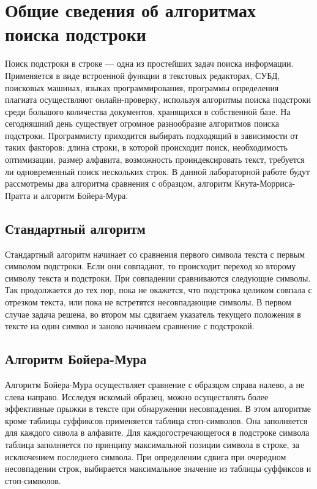 \documentclass[12pt]{report}
\begin{document}
\section{Общие сведения об алгоритмах поиска подстроки}
\par
Поиск подстроки в строке — одна из простейших задач поиска информации. Применяется в виде встроенной функции в текстовых редакторах, СУБД, поисковых машинах, языках программирования, программы определения плагиата осуществляют онлайн-проверку, используя алгоритмы поиска подстроки среди большого количества документов, хранящихся в собственной базе\cite{1}.
На сегодняшний день существует огромное разнообразие алгоритмов поиска подстроки. Программисту приходится выбирать подходящий в зависимости от таких факторов: длина строки, в которой происходит поиск, необходимость оптимизации, размер алфавита, возможность проиндексировать текст, требуется ли одновременный поиск нескольких строк.  В данной лабораторной работе будут рассмотремы два алгоритма сравнения с образцом, алгоритм Кнута-Морриса-Пратта и алгоритм Бойера-Мура.

\subsection{Стандартный алгоритм}
Стандартный алгоритм начинает со сравнения первого символа текста с первым символом подстроки. Если они совпадают, то происходит переход ко второму символу текста и подстроки. При совпадении сравниваются следующие символы. Так продолжается до тех пор, пока не окажется, что подстрока целиком совпала с отрезком текста, или пока не встретятся несовпадающие символы. В первом случае задача решена, во втором мы сдвигаем указатель текущего положения в тексте на один символ и заново начинаем сравнение с подстрокой\cite{2}.

\subsection{Алгоритм Бойера-Мура}
Алгоритм Бойера-Мура осуществляет сравнение с образцом справа налево, а не слева направо. Исследуя искомый образец, можно осуществлять более эффективные прыжки в тексте при обнаружении несовпадения. В этом алгоритме кроме таблицы суффиксов применяется таблица стоп-символов. Она заполняется для каждого сивола в алфавите. Для каждогостречающегося в подстроке символа таблица заполняется по принципу максимальной позиции символа в строке, за исключением последнего символа. При определении сдвига при очередном несовпадении строк, выбирается максимальное значение из таблицы суффиксов и стоп-символов\cite{2}.
\end{document}

